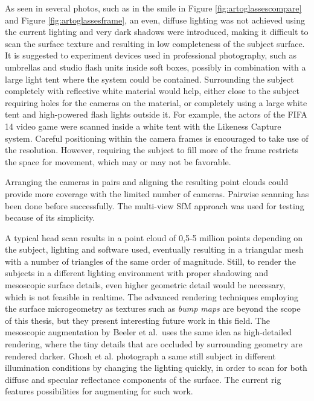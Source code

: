 As seen in several photos, such as in the smile in Figure \ref{fig:artoglassescompare} and Figure \ref{fig:artoglassesframe}, an even, diffuse lighting was not achieved using the current lighting and very dark shadows were introduced, making it difficult to scan the surface texture and resulting in low completeness of the subject surface.
It is suggested to experiment devices used in professional photography, such as umbrellas and studio flash units inside soft boxes, possibly in combination with a large light tent where the system could be contained.
Surrounding the subject completely with reflective white material would help, either close to the subject requiring holes for the cameras on the material, or completely using a large white tent and high-powered flash lights outside it.
For example, the actors of the FIFA 14 video game were scanned inside a white tent with the Likeness Capture system. \cite{eafifa14,capturelab}
Careful positioning within the camera frames is encouraged to take use of the resolution.
However, requiring the subject to fill more of the frame restricts the space for movement, which may or may not be favorable.

Arranging the cameras in pairs and aligning the resulting point clouds could provide more coverage with the limited number of cameras.
Pairwise scanning has been done before successfully. \cite{eafifa14,beeler2010high,bradley2010high}
The multi-view SfM approach was used for testing because of its simplicity.

A typical head scan results in a point cloud of 0,5-5 million points depending on the subject, lighting and software used, eventually resulting in a triangular mesh with a number of triangles of the same order of magnitude.
Still, to render the subjects in a different lighting environment with proper shadowing and mesoscopic surface details, even higher geometric detail would be necessary, which is not feasible in realtime.
The advanced rendering techniques employing the surface microgeometry as textures such as \emph{bump maps} are beyond the scope of this thesis, but they present interesting future work in this field.
The mesoscopic augmentation by Beeler et al.\ uses the same idea as high-detailed rendering, where the tiny details that are occluded by surrounding geometry are rendered darker. \cite{beeler2010high}
Ghosh et al. \cite{ghosh2011multiview} photograph a same still subject in different illumination conditions by changing the lighting quickly, in order to scan for both diffuse and specular reflectance components of the surface.
The current rig features possibilities for augmenting for such work.

